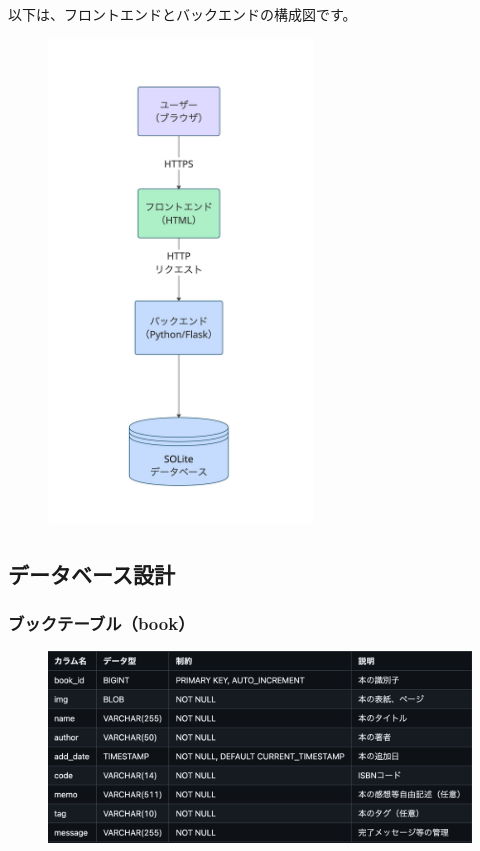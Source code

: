 \documentclass[a4paper, 11pt, titlepage]{jsarticle}
\begin{document}
以下は、フロントエンドとバックエンドの構成図です。
\begin{figure}[htbp]
\centering
\includegraphics[width=70mm]{systemStructure.jpg}
\label{fig:func}
\end{figure}

\subsection{データベース設計}
\subsubsection{ブックテーブル（book）}
\begin{figure}[htbp]
\centering
\includegraphics[width=120mm]{databasebook.png}
\label{fig:func}
\end{figure}
\end{document}
